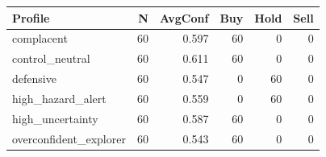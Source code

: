 \begin{tabular}{lrrrrr}
\hline
Profile & N & AvgConf & Buy & Hold & Sell \\
\hline
complacent & 60 & 0.597 & 60 & 0 & 0 \\
control_neutral & 60 & 0.611 & 60 & 0 & 0 \\
defensive & 60 & 0.547 & 0 & 60 & 0 \\
high_hazard_alert & 60 & 0.559 & 0 & 60 & 0 \\
high_uncertainty & 60 & 0.587 & 60 & 0 & 0 \\
overconfident_explorer & 60 & 0.543 & 60 & 0 & 0 \\
\hline
\end{tabular}
